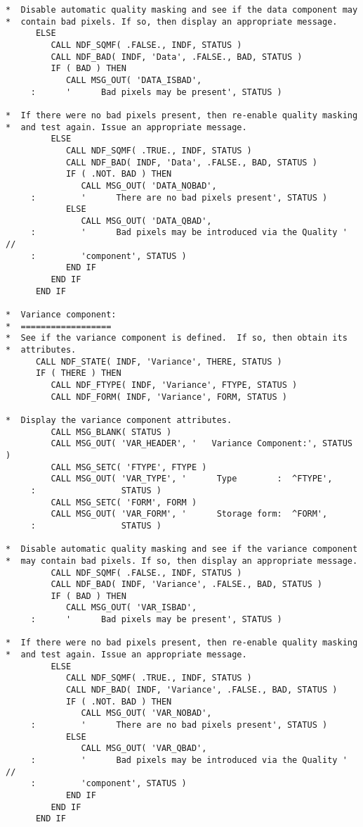 \begin{verbatim}
*  Disable automatic quality masking and see if the data component may
*  contain bad pixels. If so, then display an appropriate message.
      ELSE
         CALL NDF_SQMF( .FALSE., INDF, STATUS )
         CALL NDF_BAD( INDF, 'Data', .FALSE., BAD, STATUS )
         IF ( BAD ) THEN
            CALL MSG_OUT( 'DATA_ISBAD',
     :      '      Bad pixels may be present', STATUS )

*  If there were no bad pixels present, then re-enable quality masking
*  and test again. Issue an appropriate message.
         ELSE
            CALL NDF_SQMF( .TRUE., INDF, STATUS )
            CALL NDF_BAD( INDF, 'Data', .FALSE., BAD, STATUS )
            IF ( .NOT. BAD ) THEN
               CALL MSG_OUT( 'DATA_NOBAD',
     :         '      There are no bad pixels present', STATUS )
            ELSE
               CALL MSG_OUT( 'DATA_QBAD',
     :         '      Bad pixels may be introduced via the Quality ' //
     :         'component', STATUS )
            END IF
         END IF
      END IF

*  Variance component:
*  ==================
*  See if the variance component is defined.  If so, then obtain its
*  attributes.
      CALL NDF_STATE( INDF, 'Variance', THERE, STATUS )
      IF ( THERE ) THEN
         CALL NDF_FTYPE( INDF, 'Variance', FTYPE, STATUS )
         CALL NDF_FORM( INDF, 'Variance', FORM, STATUS )

*  Display the variance component attributes.
         CALL MSG_BLANK( STATUS )
         CALL MSG_OUT( 'VAR_HEADER', '   Variance Component:', STATUS )
         CALL MSG_SETC( 'FTYPE', FTYPE )
         CALL MSG_OUT( 'VAR_TYPE', '      Type        :  ^FTYPE',
     :                 STATUS )
         CALL MSG_SETC( 'FORM', FORM )
         CALL MSG_OUT( 'VAR_FORM', '      Storage form:  ^FORM',
     :                 STATUS )

*  Disable automatic quality masking and see if the variance component
*  may contain bad pixels. If so, then display an appropriate message.
         CALL NDF_SQMF( .FALSE., INDF, STATUS )
         CALL NDF_BAD( INDF, 'Variance', .FALSE., BAD, STATUS )
         IF ( BAD ) THEN
            CALL MSG_OUT( 'VAR_ISBAD',
     :      '      Bad pixels may be present', STATUS )

*  If there were no bad pixels present, then re-enable quality masking
*  and test again. Issue an appropriate message.
         ELSE
            CALL NDF_SQMF( .TRUE., INDF, STATUS )
            CALL NDF_BAD( INDF, 'Variance', .FALSE., BAD, STATUS )
            IF ( .NOT. BAD ) THEN
               CALL MSG_OUT( 'VAR_NOBAD',
     :         '      There are no bad pixels present', STATUS )
            ELSE
               CALL MSG_OUT( 'VAR_QBAD',
     :         '      Bad pixels may be introduced via the Quality ' //
     :         'component', STATUS )
            END IF
         END IF
      END IF


\end{verbatim}
